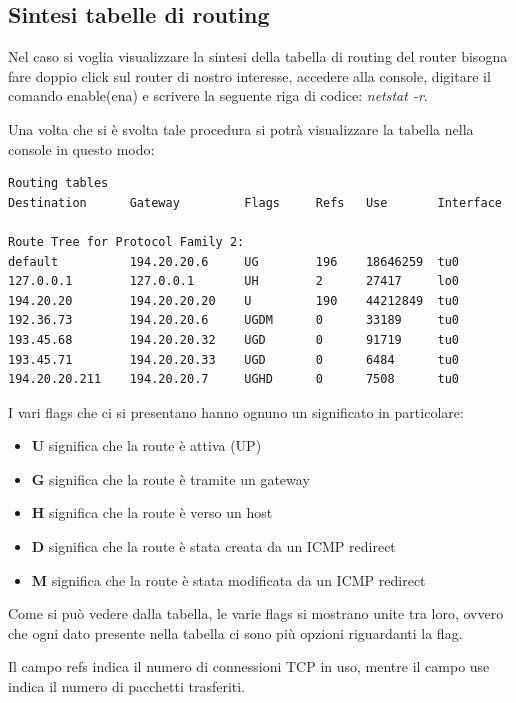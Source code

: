 \subsection{Sintesi tabelle di routing}

Nel caso si voglia visualizzare la sintesi della tabella di routing del router bisogna fare doppio click sul router di nostro interesse, accedere alla console, digitare il comando enable(ena) e scrivere la seguente riga di codice: \emph{netstat -r}.

Una volta che si è svolta tale procedura si potrà visualizzare la tabella nella console in questo modo:

\begin{verbatim}
Routing tables
Destination      Gateway         Flags     Refs   Use       Interface

Route Tree for Protocol Family 2:
default          194.20.20.6     UG        196    18646259  tu0
127.0.0.1        127.0.0.1       UH        2      27417     lo0
194.20.20        194.20.20.20    U         190    44212849  tu0
192.36.73        194.20.20.6     UGDM      0      33189     tu0
193.45.68        194.20.20.32    UGD       0      91719     tu0
193.45.71        194.20.20.33    UGD       0      6484      tu0
194.20.20.211    194.20.20.7     UGHD      0      7508      tu0
\end{verbatim}

I vari flags che ci si presentano hanno ognuno un significato in particolare:

\begin{itemize}
    \item \textbf{U} significa che la route è attiva (UP)
    \item \textbf{G} significa che la route è tramite un gateway
    \item \textbf{H} significa che la route è verso un host
    \item \textbf{D} significa che la route è stata creata da un ICMP redirect
    \item \textbf{M} significa che la route è stata modificata da un ICMP redirect
\end{itemize}

Come si può vedere dalla tabella, le varie flags si mostrano unite tra loro, ovvero che ogni dato presente nella tabella ci sono più opzioni riguardanti la flag.

Il campo refs indica il numero di connessioni TCP in uso, mentre il campo use indica il numero di pacchetti trasferiti.

